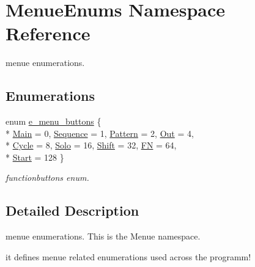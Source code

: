 \hypertarget{namespaceMenueEnums}{\section{Menue\-Enums Namespace Reference}
\label{namespaceMenueEnums}
}


menue enumerations.  


\subsection*{Enumerations}
\begin{DoxyCompactItemize}
\item 
enum \hyperlink{namespaceMenueEnums_af6a67aad066c2f00c824935e696c8a3a}{e\-\_\-menu\-\_\-buttons} \{ \\*
\hyperlink{namespaceMenueEnums_af6a67aad066c2f00c824935e696c8a3aab6933686986cb18fedc28df670b06fa7}{Main} = 0, 
\hyperlink{namespaceMenueEnums_af6a67aad066c2f00c824935e696c8a3aa5f3104915c4ce119bb55bd4a1865dd73}{Sequence} = 1, 
\hyperlink{namespaceMenueEnums_af6a67aad066c2f00c824935e696c8a3aab228309f1fc295c59026485fe0ebdcf8}{Pattern} = 2, 
\hyperlink{namespaceMenueEnums_af6a67aad066c2f00c824935e696c8a3aa269f3a35782337245c6757a6eabe4331}{Out} = 4, 
\\*
\hyperlink{namespaceMenueEnums_af6a67aad066c2f00c824935e696c8a3aa2320ec5eb74ff78149256d74f5f148e6}{Cycle} = 8, 
\hyperlink{namespaceMenueEnums_af6a67aad066c2f00c824935e696c8a3aae1508514fdfa8c10271e26d9437284ec}{Solo} = 16, 
\hyperlink{namespaceMenueEnums_af6a67aad066c2f00c824935e696c8a3aa43508916a12f4bdfdaa2aa89ef8c03ec}{Shift} = 32, 
\hyperlink{namespaceMenueEnums_af6a67aad066c2f00c824935e696c8a3aa0f0b25fbca44ecb1105c60d97732fbe4}{F\-N} = 64, 
\\*
\hyperlink{namespaceMenueEnums_af6a67aad066c2f00c824935e696c8a3aac7a1f714f21e0a524c3fe6a97211d415}{Start} = 128
 \}
\begin{DoxyCompactList}\small\item\em functionbuttons enum. \end{DoxyCompactList}\end{DoxyCompactItemize}


\subsection{Detailed Description}
menue enumerations. This is the Menue namespace.\par
 it defines menue related enumerations used across the programm! 

